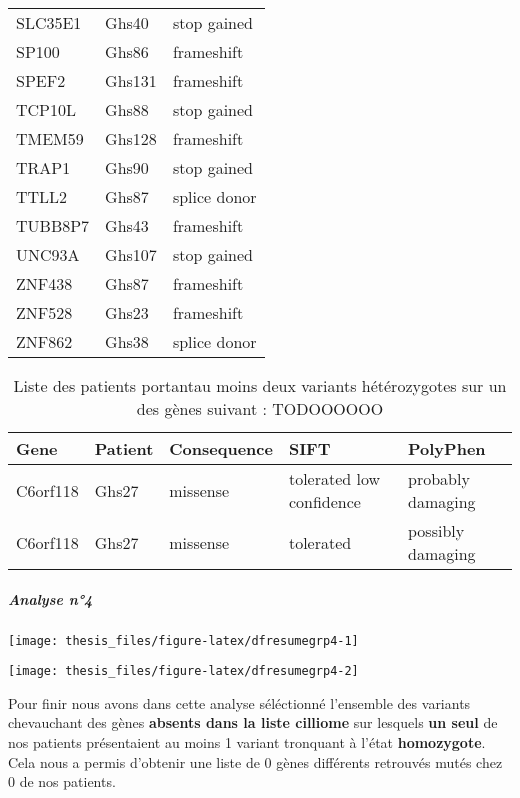 \documentclass[12pt,twoside]{reedthesis}
\theoremstyle{definition}
\theoremstyle{definition}
\theoremstyle{remark}
\begin{document}
\begin{longtable}[t]{lll}
  SLC35E1 & Ghs40 & stop gained\\
  \addlinespace
  SP100 & Ghs86 & frameshift\\
  SPEF2 & Ghs131 & frameshift\\
  TCP10L & Ghs88 & stop gained\\
  TMEM59 & Ghs128 & frameshift\\
  TRAP1 & Ghs90 & stop gained\\
  \addlinespace
  TTLL2 & Ghs87 & splice donor\\
  TUBB8P7 & Ghs43 & frameshift\\
  UNC93A & Ghs107 & stop gained\\
  ZNF438 & Ghs87 & frameshift\\
  ZNF528 & Ghs23 & frameshift\\
  ZNF862 & Ghs38 & splice donor\\
  \bottomrule
  \end{longtable}
  
  \begin{longtable}[t]{lllll}
  \caption{\label{tab:tabgrp3low}Liste des patients portantau moins deux variants hétérozygotes sur un des gènes suivant : TODOOOOOO}\\
  \toprule
  Gene & Patient & Consequence & SIFT & PolyPhen\\
  \midrule
  C6orf118 & Ghs27 & missense & tolerated low confidence & probably damaging\\
  C6orf118 & Ghs27 & missense & tolerated & possibly damaging\\
  \bottomrule
  \end{longtable}
  
  \newpage
  
  \subparagraph{Analyse n°4}\label{analyse-n4}
  
  \begin{center}\texttt{[image: thesis\_files/figure-latex/dfresumegrp4-1]} \end{center}
  
  \begin{center}\texttt{[image: thesis\_files/figure-latex/dfresumegrp4-2]} \end{center}
  
  \newpage
  
  Pour finir nous avons dans cette analyse séléctionné l'ensemble des
  variants chevauchant des gènes \textbf{absents dans la liste cilliome}
  sur lesquels \textbf{un seul} de nos patients présentaient au moins 1
  variant tronquant à l'état \textbf{homozygote}. Cela nous a permis
  d'obtenir une liste de 0 gènes différents retrouvés mutés chez 0 de nos
  patients.
  
\end{document}
